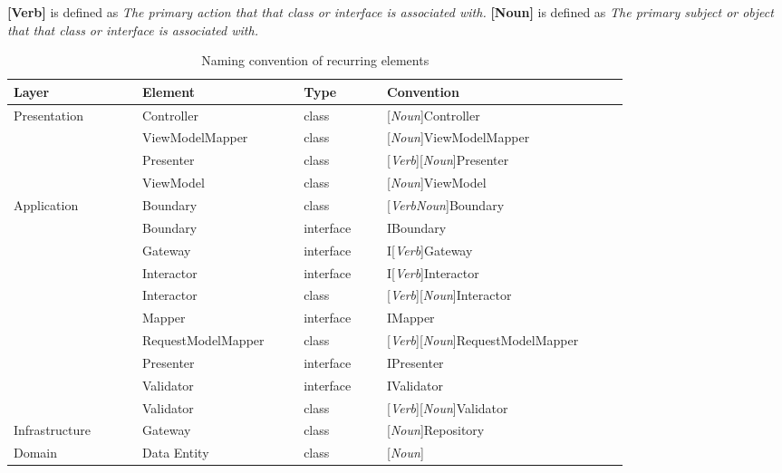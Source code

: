 \textbf{[Verb]} is defined as \textit{The primary action that that class or interface is associated with.} \newline 
\textbf{[Noun]} is defined as \textit{The primary subject or object that that class or interface is associated with.} 

\begin{table}[ht]
  \renewcommand{\arraystretch}{1.5}
  \footnotesize
  \caption{Naming convention of recurring elements}
  \begin{tabular}{ p{0.17\linewidth} p{0.19\linewidth} p{0.11\linewidth} p{0.32\linewidth} }
  \hline
  \textbf{Layer} & \textbf{Element} & \textbf{Type} & \textbf{Convention} \\ \hline
  Presentation & Controller & class & [\textit{Noun}]Controller \\
  & ViewModel\-Mapper & class & [\textit{Noun}]ViewModel\-Mapper \\
  & Presenter & class & [\textit{Verb}][\textit{Noun}]Presenter \\
  & ViewModel & class & [\textit{Noun}]ViewModel \\

  Application & Boundary & class & [\textit{VerbNoun}]Boundary \\
  & Boundary  & interface & IBoundary \\
  & Gateway  & interface & I[\textit{Verb}]Gateway \\
  & Interactor  & interface & I[\textit{Verb}]Interactor \\
  & Interactor & class & [\textit{Verb}][\textit{Noun}]Interactor \\
  & Mapper  & interface & IMapper \\
  & Request\-ModelMapper & class & [\textit{Verb}][\textit{Noun}]Request\-ModelMapper \\
  & Presenter  & interface & IPresenter \\
  & Validator  & interface & IValidator \\
  & Validator & class & [\textit{Verb}][\textit{Noun}]Validator \\
  
  Infrastructure & Gateway & class & [\textit{Noun}]Repository \\

  Domain & Data Entity & class & [\textit{Noun}] \\ \hline

  \end{tabular}
  
  \label{table_element_naming_convention}
\end{table}